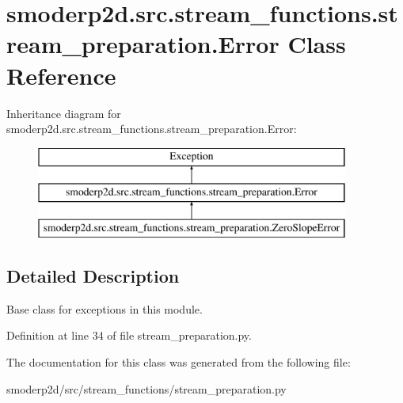 \hypertarget{classsmoderp2d_1_1src_1_1stream__functions_1_1stream__preparation_1_1Error}{\section{smoderp2d.\-src.\-stream\-\_\-functions.\-stream\-\_\-preparation.\-Error Class Reference}
\label{classsmoderp2d_1_1src_1_1stream__functions_1_1stream__preparation_1_1Error}
}
Inheritance diagram for smoderp2d.\-src.\-stream\-\_\-functions.\-stream\-\_\-preparation.\-Error\-:\begin{figure}[H]
\begin{center}
\leavevmode
\includegraphics[height=3.000000cm]{dd/d48/classsmoderp2d_1_1src_1_1stream__functions_1_1stream__preparation_1_1Error}
\end{center}
\end{figure}


\subsection{Detailed Description}
\begin{DoxyVerb}Base class for exceptions in this module.\end{DoxyVerb}
 

Definition at line 34 of file stream\-\_\-preparation.\-py.



The documentation for this class was generated from the following file\-:\begin{DoxyCompactItemize}
\item 
smoderp2d/src/stream\-\_\-functions/stream\-\_\-preparation.\-py\end{DoxyCompactItemize}
